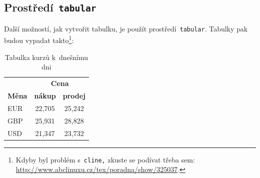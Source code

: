 \documentclass[11pt]{article}
\begin{document}
\subsection{Prostředí\texttt{ tabular}}
Další možností, jak vytvořit tabulku, je použít prostředí\texttt{ tabular}. Tabulky pak budou vypadat takto\footnote{Kdyby byl problém s\texttt{ cline,} zkuste se podívat třeba sem: \url{http://www.abclinuxu.cz/tex/poradna/show/325037}.}:
\bigskip
\begin{table}[h]
    \begin{center}
        \begin{tabular}{|l|c|c|}
            \hline
                          & \multicolumn{2}{|c|}{\textbf{Cena}}                   \\
            \cline{2-3}
            \textbf{Měna} & \textbf{nákup}                      & \textbf{prodej} \\
            \hline
            EUR           & 22,705                              & 25,242          \\
            GBP           & 25,931                              & 28,828          \\
            USD           & 21,347                              & 23,732          \\
            \hline
        \end{tabular}
        \caption{Tabulka kurzů k~dnešnímu dni}
        \label{tab:rates}
    \end{center}
\end{table}
\end{document}
